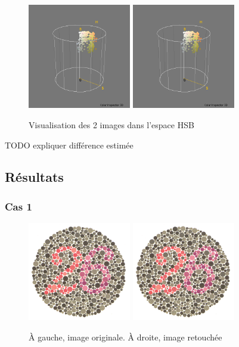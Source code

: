 \documentclass[a4paper]{article}
\begin{document}
\begin{figure}[H]
\begin{center}
\includegraphics[width=170px]{../resultats/e1_q1_k4_6.png}
\includegraphics[width=170px]{../resultats/e1_q1_k4_lumi.png}
\end{center}
\caption{Visualisation des 2 images dans l'espace HSB}
\end{figure}

TODO expliquer différence estimée

\clearpage
\subsection{Résultats}

\subsubsection{Cas 1}

\begin{figure}[H]
\begin{center}
\includegraphics[width=170px]{../base/cas_1_dalton26.png}
\includegraphics[width=170px]{../resultats/e1_q2_k1_luminance.png}
\end{center}
\caption{À gauche, image originale. À droite, image retouchée}
\end{figure}
\end{document}
